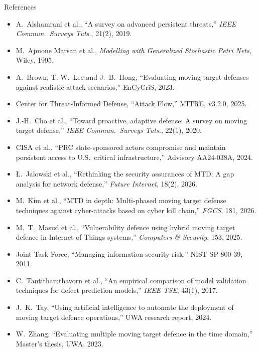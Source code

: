\documentclass[aspectratio=169,11pt]{beamer}
\begin{document}
\begin{frame}{References}
\scriptsize
\begin{itemize}
  \item[] A.~Alshamrani et al., ``A survey on advanced persistent threats,'' \emph{IEEE Commun.\ Surveys Tuts.}, 21(2), 2019.
  \item[] M.~Ajmone Marsan et al., \emph{Modelling with Generalized Stochastic Petri Nets}, Wiley, 1995.
  \item[] A.~Brown, T.-W.~Lee and J.~B.~Hong, ``Evaluating moving target defenses against realistic attack scenarios,'' EnCyCriS, 2023.
  \item[] Center for Threat-Informed Defense, ``Attack Flow,'' MITRE, v3.2.0, 2025.
  \item[] J.-H.~Cho et al., ``Toward proactive, adaptive defense: A survey on moving target defense,'' \emph{IEEE Commun.\ Surveys Tuts.}, 22(1), 2020.
  \item[] CISA et al., ``PRC state-sponsored actors compromise and maintain persistent access to U.S.\ critical infrastructure,'' Advisory AA24-038A, 2024.
  \item[] {\L}.~Jalowski et al., ``Rethinking the security assurances of MTD: A gap analysis for network defense,'' \emph{Future Internet}, 18(2), 2026.
  \item[] M.~Kim et al., ``MTD in depth: Multi-phased moving target defense techniques against cyber-attacks based on cyber kill chain,'' \emph{FGCS}, 181, 2026.
  \item[] M.~T.~Masud et al., ``Vulnerability defence using hybrid moving target defence in Internet of Things systems,'' \emph{Computers \& Security}, 153, 2025.
  \item[] Joint Task Force, ``Managing information security risk,'' NIST SP 800-39, 2011.
  \item[] C.~Tantithamthavorn et al., ``An empirical comparison of model validation techniques for defect prediction models,'' \emph{IEEE TSE}, 43(1), 2017.
  \item[] J.~K.~Tay, ``Using artificial intelligence to automate the deployment of moving target defence operations,'' UWA research report, 2024.
  \item[] W.~Zhang, ``Evaluating multiple moving target defence in the time domain,'' Master's thesis, UWA, 2023.
\end{itemize}
\end{frame}
\end{document}
